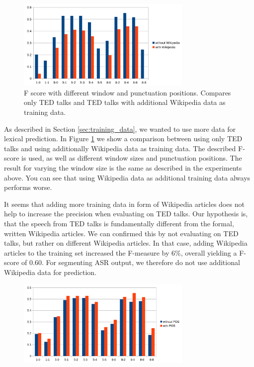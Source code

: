 \begin{figure}[ht]
    \centering
    \includegraphics[width=0.75\textwidth]{img/window_wiki_eval.png}
    \caption{F score with different window and punctuation positions. Compares only TED talks and TED talks with additional Wikipedia data as training data.}
    \label{fig:window_wiki_eval}
\end{figure}

As described in Section \ref{sec:training_data}, we wanted to use more data for lexical prediction.
In Figure \ref{fig:window_wiki_eval} we show a comparison between using only TED talks and using additionally Wikipedia data as training data.
The described F-score is used, as well as different window sizes and punctuation positions.
The result for varying the window size is the same as described in the experiments above.
You can see that using Wikipedia data as additional training data always performs worse.

It seems that adding more training data in form of Wikipedia articles does not help to increase the precision when evaluating on TED talks.
Our hypothesis is, that the speech from TED talks is fundamentally different from the formal, written Wikipedia articles.
We can confirmed this by not evaluating on TED talks, but rather on different Wikipedia articles.
In that case, adding Wikipedia articles to the training set increased the F-measure by 6\%, overall yielding a F-score of 0.60.
For segmenting ASR output, we therefore do not use additional Wikipedia data for prediction.

\begin{figure}[ht]
    \centering
    \includegraphics[width=0.75\textwidth]{img/window_pos_eval.png}
    \caption{}
    \label{fig:window_pos_eval}
\end{figure}

